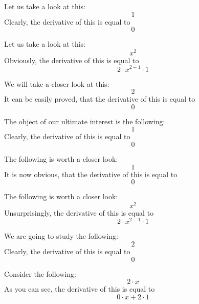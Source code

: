 \documentclass{article}
\begin{document}
Let us take a look at this:
\begin{equation}
1 
\end{equation}
Clearly, the derivative of this is equal to
\begin{equation}
0 
\end{equation}

Let us take a look at this:
\begin{equation}
x ^{2 } 
\end{equation}
Obviously, the derivative of this is equal to
\begin{equation}
2 \cdot x ^{2 - 1 } \cdot 1 
\end{equation}

We will take a closer look at this:
\begin{equation}
2 
\end{equation}
It can be easily proved, that the derivative of this is equal to
\begin{equation}
0 
\end{equation}

The object of our ultimate interest is the following:
\begin{equation}
1 
\end{equation}
Clearly, the derivative of this is equal to
\begin{equation}
0 
\end{equation}

The following is worth a closer look:
\begin{equation}
1 
\end{equation}
It is now obvious, that the derivative of this is equal to
\begin{equation}
0 
\end{equation}

The following is worth a closer look:
\begin{equation}
x ^{2 } 
\end{equation}
Unsurprisingly, the derivative of this is equal to
\begin{equation}
2 \cdot x ^{2 - 1 } \cdot 1 
\end{equation}

We are going to study the following:
\begin{equation}
2 
\end{equation}
Clearly, the derivative of this is equal to
\begin{equation}
0 
\end{equation}

Consider the following:
\begin{equation}
2 \cdot x 
\end{equation}
As you can see, the derivative of this is equal to
\begin{equation}
0 \cdot x + 2 \cdot 1 
\end{equation}
\end{document}
